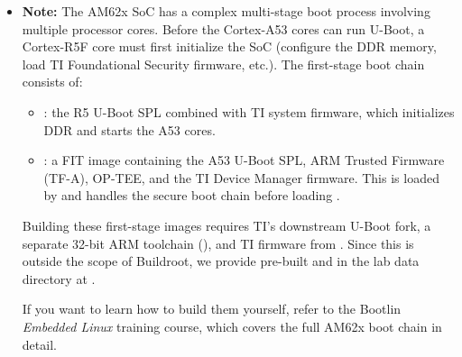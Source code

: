 \begin{itemize}
\begin{itemize}
  \item Use the custom version of U-Boot .

  \item The BeaglePlay uses the TI AM62x SoC from the K3 family. The
    U-Boot configuration for the A53 cores is
    . So enter
     as the .

  \item Select  as the .
    We only need Buildroot to produce  (the second
    stage bootloader). The first stage bootloaders are provided
    pre-built (see note below).

  \item In , enter
    . This allows the U-Boot build to
    complete even though we are not building the first-stage boot
    images (which require additional firmware blobs).

  \end{itemize}

\item {\bf Note:} The AM62x SoC has a complex multi-stage boot
    process involving multiple processor cores. Before the Cortex-A53
    cores can run U-Boot, a Cortex-R5F core must first initialize the
    SoC (configure the DDR memory, load TI Foundational Security
    firmware, etc.). The first-stage boot chain consists of:

    \begin{itemize}
    \item {}: the R5 U-Boot SPL combined with TI
      system firmware, which initializes DDR and starts the A53 cores.
    \item {}: a FIT image containing the A53 U-Boot SPL,
      ARM Trusted Firmware (TF-A), OP-TEE, and the TI Device Manager
      firmware. This is loaded by  and handles the
      secure boot chain before loading .
    \end{itemize}

    Building these first-stage images requires TI's downstream U-Boot
    fork, a separate 32-bit ARM toolchain (), and
    TI firmware from . Since this is outside
    the scope of Buildroot, we provide pre-built 
    and  in the lab data directory at
    .

    If you want to learn how to build them yourself, refer to the
    Bootlin {\em Embedded Linux} training course, which covers the
    full AM62x boot chain in detail.

\end{itemize}

